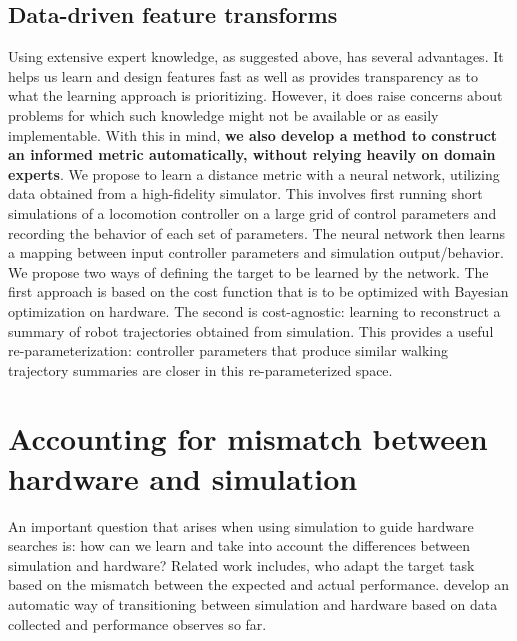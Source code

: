 
 \subsection{Data-driven feature transforms}
Using extensive expert knowledge, as suggested above, has several advantages. It helps us learn and design features fast as well as provides transparency as to what the learning approach is prioritizing. However, it does raise concerns about problems for which such knowledge might not be available or as easily implementable. With this in mind, \textbf{we also develop a method to construct an informed metric automatically, without relying heavily on domain experts}. We propose to learn a distance metric with a neural network, utilizing data obtained from a high-fidelity simulator. This involves first running short simulations of a locomotion controller on a large grid of control parameters and recording the behavior of each set of parameters. The neural network then learns a mapping between input controller parameters and simulation output/behavior. We propose two ways of defining the target to be learned by the network. The first approach is based on the cost function that is to be optimized with Bayesian optimization on hardware. The second is cost-agnostic: learning to reconstruct a summary of robot trajectories obtained from simulation. This provides a useful re-parameterization: controller parameters that produce similar walking trajectory summaries are closer in this re-parameterized space. 
 

\section{Accounting for mismatch between hardware and simulation}
 An important question that arises when using simulation to guide hardware searches is: how can we learn and take into account the differences between simulation and hardware? Related work includes, \cite{macalpine2016adaptation} who adapt the target task based on the mismatch between the expected and actual performance. \cite{marco2017virtual} develop an automatic way of transitioning between simulation and hardware based on data collected and performance observes so far. 
 
